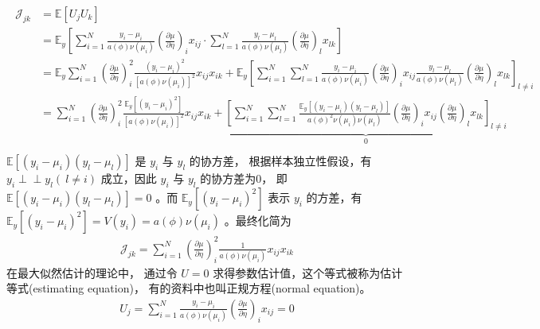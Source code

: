 \documentclass[letterpaper,10pt,english]{sphinxmanual}
\begin{document}
\begin{align}\label{equation:广义线性模型/estimate:广义线性模型/estimate:9}\!\begin{aligned}
\mathcal{J}_{jk} &= \mathbb{E}[U_jU_k]\\
&= \mathbb{E}_{y} \left [
\sum_{i=1}^N \frac{y_i-\mu_i}{a(\phi) \nu(\mu_i) } \left ( \frac{\partial \mu}{\partial \eta} \right )_i x_{ij}
\cdot
\sum_{l=1}^N \frac{y_l-\mu_l}{a(\phi) \nu(\mu_l) } \left ( \frac{\partial \mu}{\partial \eta} \right )_l x_{lk}
\right ]\\
&= \mathbb{E}_{y} \sum_{i=1}^N \left ( \frac{\partial \mu}{\partial \eta} \right )^2_i
\frac{ (y_i-\mu_i)^2}{ [a(\phi) \nu(\mu_i)]^2 }   x_{ij} x_{ik}
+ \mathbb{E}_{y} \left [
\sum_{i=1}^N \sum_{l=1}^N   \frac{y_i-\mu_i}{a(\phi) \nu(\mu_i) } \left ( \frac{\partial \mu}{\partial \eta} \right )_i x_{ij}
\frac{y_l-\mu_l}{a(\phi) \nu(\mu_l) } \left ( \frac{\partial \mu}{\partial \eta} \right )_l x_{lk}
\right ]_{l\ne i}\\
&= \sum_{i=1}^N \left ( \frac{\partial \mu}{\partial \eta} \right )^2_i
\frac{ \mathbb{E}_{y}[(y_i-\mu_i)^2]}{ [a(\phi) \nu(\mu_i)]^2 }
x_{ij} x_{ik}
+  \underbrace{\left [
\sum_{i=1}^N \sum_{l=1}^N   \frac{ \mathbb{E}_{y}[(y_i-\mu_i)(y_l-\mu_l)]}{a(\phi)^2 \nu(\mu_i) \nu(\mu_l) } \left ( \frac{\partial \mu}{\partial \eta} \right )_i x_{ij}
 \left ( \frac{\partial \mu}{\partial \eta} \right )_l x_{lk}
\right ]_{l\ne i}}_{0}\\
\end{aligned}\end{align}
\(\mathbb{E}[(y_i-\mu_i)(y_l-\mu_l)]\)
是 \(y_i\) 与 \(y_l\) 的协方差，
根据样本独立性假设，有 \(y_i \perp \!\!\! \perp  y_l (\ l \ne i)\)
成立，因此 \(y_i\) 与 \(y_l\) 的协方差为0，
即 \(\mathbb{E}[(y_i-\mu_i)(y_l-\mu_l)]=0\)
。而 \(\mathbb{E}_{y}[(y_i-\mu_i)^2]\) 表示 \(y_i\)
的方差，有 \(\mathbb{E}_{y}[(y_i-\mu_i)^2]=V(y_i)=a(\phi)\nu(\mu_i)\)
。最终化简为
\begin{equation}\label{equation:广义线性模型/estimate:eq_glm_estimate_019}
\begin{split}\mathcal{J}_{jk} = \sum_{i=1}^N \left ( \frac{\partial \mu}{\partial \eta} \right )^2_i
\frac{1}{ a(\phi) \nu(\mu_i) }
x_{ij} x_{ik}\end{split}
\end{equation}
在最大似然估计的理论中，
通过令 \(U=0\) 求得参数估计值，这个等式被称为估计等式(estimating equation)，
有的资料中也叫正规方程(normal equation)。
\begin{equation}\label{equation:广义线性模型/estimate:eq_glm_estimate_020}
\begin{split}   U_j
   = \sum_{i=1}^N \frac{y_i-\mu_i}{a(\phi) \nu(\mu_i) }
    \left ( \frac{\partial \mu}{\partial \eta} \right )_i x_{ij}
   = 0\end{split}
\end{equation}
\end{document}

